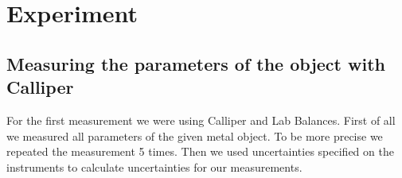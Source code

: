 \section{Experiment}

\subsection{Measuring the parameters of the object with Calliper}

For the first measurement we were using Calliper and Lab Balances. First of all we measured all parameters of the given metal object. To be more precise we repeated the measurement 5 times. Then we used uncertainties specified on the instruments to calculate uncertainties for our measurements. 



